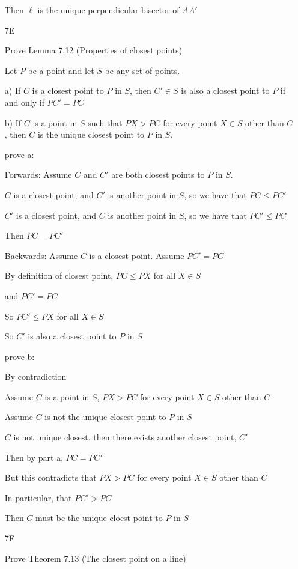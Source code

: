\documentclass[11pt]{article}
\newcommand{\segment}[1]{\overline{#1}}
\begin{document}
\begin{itemize}
		Then $\ell$ is the unique perpendicular bisector of $\segment{AA'}$

\item[7E]

	Prove Lemma 7.12 (Properties of closest points)

	Let $P$ be a point and let $S$ be any set of points.

		a) If $C$ is a closest point to $P$ in $S$, then $C' \in S$ is also a closest point to $P$ if and only if $PC' = PC$

		b) If $C$ is a point in $S$ such that $PX > PC$ for every point $X \in S$ other than $C$, then $C$ is the unique closest point to $P$ in $S$.

	prove a: 
	
	Forwards: Assume $C$ and $C'$ are both closest points to $P$ in $S$. 
		
	$C$ is a closest point, and $C'$ is another point in $S$, so we have that $PC \leq PC'$

	$C'$ is a closest point, and $C$ is another point in $S$, so we have that $PC' \leq PC$

	Then $PC = PC'$

	Backwards: Assume $C$ is a closest point. Assume $PC' = PC$ 

	By definition of closest point, $PC \leq PX$ for all $X \in S$ 

	and $PC' = PC$

	So $PC' \leq PX$ for all $X \in S$

	So $C'$ is also a closest point to $P$ in $S$

	prove b: 

	By contradiction
	
	Assume $C$ is a point in $S$, $PX > PC$ for every point $X\in S$ other than $C$

	Assume $C$ is not the unique closest point to $P$ in $S$

	$C$ is not unique closest, then there exists another closest point, $C'$

	Then by part a, $PC = PC'$

	But this contradicts that $PX > PC$ for every point $X \in S$ other than $C$

	In particular, that $PC' > PC$

	Then $C$ must be the unique cloest point to $P$ in $S$

\item[7F]

	Prove Theorem 7.13 (The closest point on a line)


\end{itemize}
\end{document}
